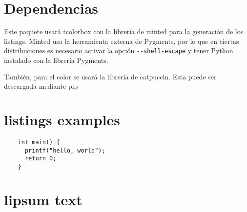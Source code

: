\documentclass[theme=mocha, pagecolor=true, pagesize=a5paper]{qx-files/qx-notes}
\begin{document}
  \section{Dependencias}

  Este paquete usará tcolorbox con la librería de minted para la generación de los listings. Minted usa la herramienta externa de Pygments, por lo que en ciertas distribuciones es necesario activar la opción \verb|--shell-escape| y tener Python instalado con la librería Pygments.

  También, para el color se usará la librería de catpuccin. Esta puede ser descargada mediante pip


  \section{listings examples}

  \begin{verbatim}
    int main() {
      printf("hello, world");
      return 0;
    }
  \end{verbatim}

  \section{lipsum text}

  \lipsum
\end{document}
